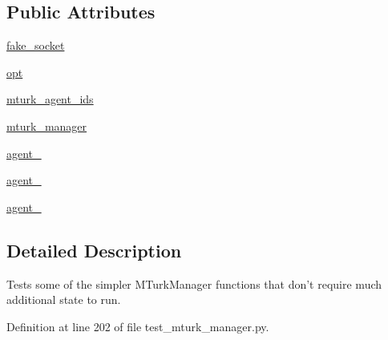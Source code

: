 \subsection*{Public Attributes}
\begin{DoxyCompactItemize}
\item 
\hyperlink{classparlai_1_1mturk_1_1core_1_1dev_1_1test_1_1test__mturk__manager_1_1TestMTurkManagerUnitFunctions_a1e84c87faf30268659b805a20bbc5b61}{fake\+\_\+socket}
\item 
\hyperlink{classparlai_1_1mturk_1_1core_1_1dev_1_1test_1_1test__mturk__manager_1_1TestMTurkManagerUnitFunctions_ac17240901eca7de90b9bda1d0ef51ee5}{opt}
\item 
\hyperlink{classparlai_1_1mturk_1_1core_1_1dev_1_1test_1_1test__mturk__manager_1_1TestMTurkManagerUnitFunctions_a094ae6babb0713956db4a8d26638b3bc}{mturk\+\_\+agent\+\_\+ids}
\item 
\hyperlink{classparlai_1_1mturk_1_1core_1_1dev_1_1test_1_1test__mturk__manager_1_1TestMTurkManagerUnitFunctions_a61563b3db9de781c6e01dde102732082}{mturk\+\_\+manager}
\item 
\hyperlink{classparlai_1_1mturk_1_1core_1_1dev_1_1test_1_1test__mturk__manager_1_1TestMTurkManagerUnitFunctions_a0ddc7e52e532e3d6066e357237af8884}{agent\+\_}
\item 
\hyperlink{classparlai_1_1mturk_1_1core_1_1dev_1_1test_1_1test__mturk__manager_1_1TestMTurkManagerUnitFunctions_ada8da646678c6556ef649b54579f289a}{agent\+\_}
\item 
\hyperlink{classparlai_1_1mturk_1_1core_1_1dev_1_1test_1_1test__mturk__manager_1_1TestMTurkManagerUnitFunctions_ac1fca9dd6e40519f94317db78c8d25c6}{agent\+\_}
\end{DoxyCompactItemize}


\subsection{Detailed Description}
\begin{DoxyVerb}Tests some of the simpler MTurkManager functions that don't require much additional
state to run.
\end{DoxyVerb}
 

Definition at line 202 of file test\+\_\+mturk\+\_\+manager.\+py.




